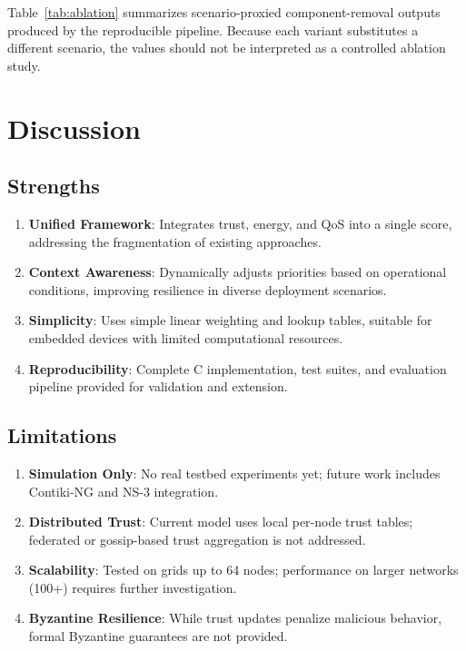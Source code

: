 \documentclass[conference]{IEEEtran}
\begin{document}


Table~\ref{tab:ablation} summarizes scenario-proxied component-removal outputs produced by the reproducible pipeline. Because each variant substitutes a different scenario, the values should not be interpreted as a controlled ablation study.

\section{Discussion}

\subsection{Strengths}

\begin{enumerate}
\item \textbf{Unified Framework}: Integrates trust, energy, and QoS into a single score, addressing the fragmentation of existing approaches.
\item \textbf{Context Awareness}: Dynamically adjusts priorities based on operational conditions, improving resilience in diverse deployment scenarios.
\item \textbf{Simplicity}: Uses simple linear weighting and lookup tables, suitable for embedded devices with limited computational resources.
\item \textbf{Reproducibility}: Complete C implementation, test suites, and evaluation pipeline provided for validation and extension.
\end{enumerate}

\subsection{Limitations}

\begin{enumerate}
\item \textbf{Simulation Only}: No real testbed experiments yet; future work includes Contiki-NG and NS-3 integration.
\item \textbf{Distributed Trust}: Current model uses local per-node trust tables; federated or gossip-based trust aggregation is not addressed.
\item \textbf{Scalability}: Tested on grids up to 64 nodes; performance on larger networks (100+) requires further investigation.
\item \textbf{Byzantine Resilience}: While trust updates penalize malicious behavior, formal Byzantine guarantees are not provided.
\end{enumerate}
\end{document}
